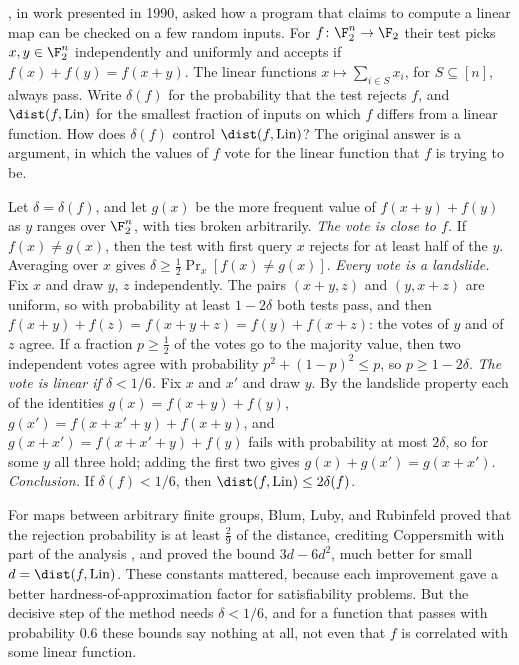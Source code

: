 \begin{refsection}
\Textcite{BlumLubyRubinfeld1993}, in work presented in 1990, asked how a program that claims to compute a linear map can be checked on a few random inputs. For $f\colon\F_2^n\to\F_2$ their test picks $x,y\in\F_2^n$ independently and uniformly and accepts if $f(x)+f(y)=f(x+y)$. The linear functions $x\mapsto\sum_{i\in S}x_i$, for $S\subseteq[n]$, always pass. Write $\delta(f)$ for the probability that the test rejects $f$, and $\dist(f,\fourierLin)$ for the smallest fraction of inputs on which $f$ differs from a linear function. How does $\delta(f)$ control $\dist(f,\fourierLin)$? The original answer is a  argument, in which the values of $f$ vote for the linear function that $f$ is trying to be.

\begin{aside}
Let $\delta=\delta(f)$, and let $g(x)$ be the more frequent value of $f(x+y)+f(y)$ as $y$ ranges over $\F_2^n$, with ties broken arbitrarily.
\emph{The vote is close to $f$.} If $f(x)\ne g(x)$, then the test with first query $x$ rejects for at least half of the $y$. Averaging over $x$ gives $\delta\ge\frac12\Pr_x[f(x)\ne g(x)]$.
\emph{Every vote is a landslide.} Fix $x$ and draw $y$, $z$ independently. The pairs $(x+y,z)$ and $(y,x+z)$ are uniform, so with probability at least $1-2\delta$ both tests pass, and then $f(x+y)+f(z)=f(x+y+z)=f(y)+f(x+z)$: the votes of $y$ and of $z$ agree. If a fraction $p\ge\frac12$ of the votes go to the majority value, then two independent votes agree with probability $p^2+(1-p)^2\le p$, so $p\ge1-2\delta$.
\emph{The vote is linear if $\delta<1/6$.} Fix $x$ and $x'$ and draw $y$. By the landslide property each of the identities $g(x)=f(x+y)+f(y)$, $g(x')=f(x+x'+y)+f(x+y)$, and $g(x+x')=f(x+x'+y)+f(y)$ fails with probability at most $2\delta$, so for some $y$ all three hold; adding the first two gives $g(x)+g(x')=g(x+x')$.
\emph{Conclusion.} If $\delta(f)<1/6$, then $\dist(f,\fourierLin)\le2\delta(f)$.
\end{aside}

For maps between arbitrary finite groups, Blum, Luby, and Rubinfeld proved that the rejection probability is at least $\frac29$ of the distance, crediting Coppersmith with part of the analysis \parencite[as recounted by][]{BellareEtAl1996}, and \textcite{BellareEtAl1993} proved the bound $3d-6d^2$, much better for small $d=\dist(f,\fourierLin)$. These constants mattered, because each improvement gave a better hardness-of-approximation factor for satisfiability problems. But the decisive step of the method needs $\delta<1/6$, and for a function that passes with probability $0.6$ these bounds say nothing at all, not even that $f$ is correlated with some linear function.


\end{refsection}
